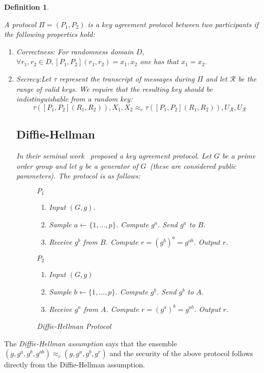 \documentclass{article}
\newtheorem{defn}[thm]{Definition}
\newenvironment{definition}{\begin{defn}\begin{em}}%
{\end{em}\end{defn}}
\begin{document}
\begin{definition}
A protocol $\Pi = (P_1, P_2)$ is a key agreement protocol between two participants if the following properties hold:
\begin{enumerate}
\item Correctness: For randomness domain $D$, $\forall r_1, r_2\in D, [P_1, P_2](r_1, r_2) = x_1, x_2$ one has that $x_1 = x_2$.
\item Secrecy:Let $\tau$ represent the transcript of messages during $\Pi$ and let $\mathcal{R}$ be the range of valid keys.  We require that the resulting key should be indistinguishable from a random key:
\[
\tau([P_1, P_2](R_1, R_2)), X_1, X_2 \approx_c \tau([P_1, P_2](R_1, R_2)), U_{\mathcal{R}}, U_{\mathcal{R}}
\]
\subsection{Diffie-Hellman}
In their seminal work~\cite{diffieHellman} proposed a key agreement protocol.  Let $G$ be a prime order group and let $g$ be a generator of $G$~(these are considered public parameters).  The protocol is as follows:

\begin{figure}[ht]
\begin{minipage}[t]{0.5\linewidth}
\centering
\textbf{$P_1$}
\begin{enumerate}
\item Input $(G, g)$.
\item Sample $a\leftarrow \{1, ..., p\}$.  Compute $g^a$.  Send $g^a$ to $B$.
\vspace{.1in}
\item Receive $g^b$ from $B$.  Compute $r = (g^b)^a = g^{ab}$.  Output $r$.
\end{enumerate}
\label{fig:DHa}
\end{minipage}
\hspace{0.5cm}
\begin{minipage}[t]{0.5\linewidth}
\centering
\textbf{$P_2$}
\begin{enumerate}
\item Input $(G, g)$
\item Sample $b\leftarrow \{1,...,p\}$.  Compute $g^b$.  Send $g^b$ to $A$.
\item Receive $g^a$ from $A$.  Compute $r = (g^a)^b = g^{ab}$.  Output $r$.
\end{enumerate}
\label{fig:DHb}
\end{minipage}
\caption{Diffie-Hellman Protocol}
\label{fig:DH}
\end{figure}
\end{enumerate}
\end{definition} 
The \emph{Diffie-Hellman assumption} says that the ensemble $(g, g^a, g^b, g^{ab}) \approx_c (g, g^a, g^b, g^r)$ and the security of the above protocol follows directly from the Diffie-Hellman assumption.


\end{document}
